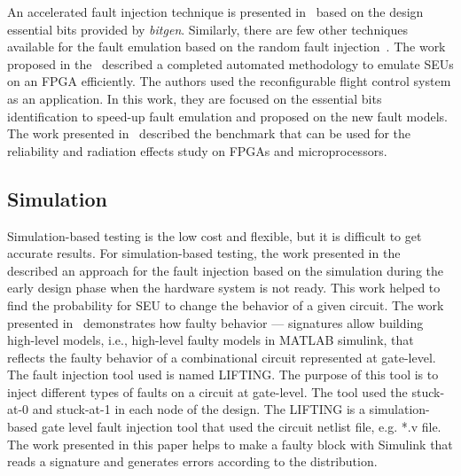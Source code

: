 An accelerated fault injection technique is presented in~\citep{di2014fault} based on the design essential bits provided by  \textit{bitgen}. Similarly, there are few other techniques available for the fault emulation based on the random fault injection~\citep{faure2005single}.
The work proposed in the~\cite{hobeika2013flight} described a completed automated methodology to emulate SEUs on an FPGA efficiently. The authors used the reconfigurable flight control system as an application.
In this work, they are focused on the essential bits identification to speed-up fault emulation and proposed on the new fault models.
The work presented in~\cite{quinn2015using} described the benchmark that can be used for the reliability and radiation effects study on FPGAs and microprocessors. 
\subsection{Simulation}
Simulation-based testing is the low cost and flexible, but it is difficult to get accurate results. For simulation-based testing, the work presented in the~\citep{violante2004simulation} described an approach for the fault injection based on the simulation during the early design phase when the hardware system is not ready.  This work helped to find the probability for SEU to change the behavior of a given circuit.
The work presented in~\citep{robache2013methodology} demonstrates how faulty behavior --- signatures allow building high-level models, i.e., high-level faulty models in MATLAB simulink, that reflects the faulty behavior of a combinational circuit represented at gate-level. The fault injection tool used is named  LIFTING.  The purpose of this tool is to inject different types of faults on a circuit at gate-level. The tool used the stuck-at-0 and stuck-at-1 in each node of the design. The LIFTING is a simulation-based gate level fault injection tool that used the circuit netlist file, e.g.  *.v file. The work presented in this paper helps to make a faulty block with Simulink that reads a signature and generates errors according to the distribution.
